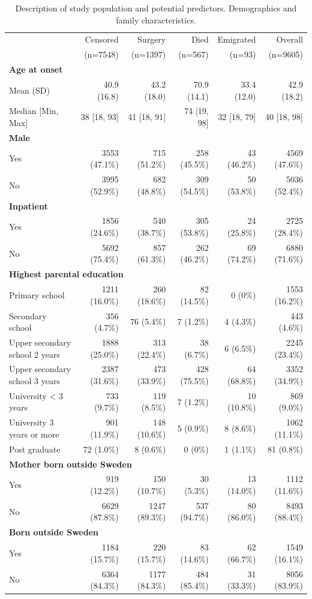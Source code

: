 \documentclass{statsoc}
\begin{document}
\begin{table}
\caption{\label{tab1} Description of study population and potential predictors. Demographics and family characteristics. } 
\centering
\begin{tabular}{p{3cm}rrrrr}
\hline
& Censored & Surgery & Died & Emigrated &  Overall \\
& (n=7548) & (n=1397) & (n=567) & (n=93) & (n=9605) \\
\hline
\textbf{Age at onset} & & & & & \\
Mean (SD) & 40.9 (16.8) & 43.2 (18.0) & 70.9 (14.1) & 33.4 (12.0) & 42.9
(18.2) \\
Median {[}Min, Max{]} & 38 {[}18, 93{]} & 41 {[}18, 91{]} &
74 {[}19, 98{]} & 32 {[}18, 79{]} & 40 {[}18, 98{]} \\
\textbf{Male} & & & & & \\
Yes & 3553 (47.1\%) & 715 (51.2\%) & 258 (45.5\%) & 43 (46.2\%) & 4569
(47.6\%) \\
No & 3995 (52.9\%) & 682 (48.8\%) & 309 (54.5\%) & 50 (53.8\%) & 5036
(52.4\%) \\
\textbf{Inpatient} & & & & & \\
Yes & 1856 (24.6\%) & 540 (38.7\%) & 305 (53.8\%) & 24 (25.8\%) & 2725
(28.4\%) \\
No & 5692 (75.4\%) & 857 (61.3\%) & 262 (46.2\%) & 69 (74.2\%) & 6880
(71.6\%) \\
\multicolumn{3}{l}{\textbf{Highest parental education}} & & & \\
Primary school & 1211 (16.0\%) & 260 (18.6\%) & 82 (14.5\%) & 0 (0\%) &
1553 (16.2\%) \\
Secondary school & 356 (4.7\%) & 76 (5.4\%) & 7 (1.2\%) & 4 (4.3\%) &
443 (4.6\%) \\
Upper secondary school 2 years & 1888 (25.0\%) & 313 (22.4\%) & 38
(6.7\%) & 6 (6.5\%) & 2245 (23.4\%) \\
Upper secondary school 3 years & 2387 (31.6\%) & 473 (33.9\%) & 428
(75.5\%) & 64 (68.8\%) & 3352 (34.9\%) \\
University \textless{} 3 years & 733 (9.7\%) & 119 (8.5\%) & 7 (1.2\%) &
10 (10.8\%) & 869 (9.0\%) \\
University 3 years or more & 901 (11.9\%) & 148 (10.6\%) & 5 (0.9\%) & 8
(8.6\%) & 1062 (11.1\%) \\
Post graduate & 72 (1.0\%) & 8 (0.6\%) & 0 (0\%) & 1 (1.1\%) & 81
(0.8\%) \\
\multicolumn{3}{l}{\textbf{Mother born outside Sweden}} & & & \\
Yes & 919 (12.2\%) & 150 (10.7\%) & 30 (5.3\%) & 13 (14.0\%) & 1112
(11.6\%) \\
No & 6629 (87.8\%) & 1247 (89.3\%) & 537 (94.7\%) & 80 (86.0\%) & 8493
(88.4\%) \\
\multicolumn{3}{l}{\textbf{Born outside Sweden}} & & & \\
Yes & 1184 (15.7\%) & 220 (15.7\%) & 83 (14.6\%) & 62 (66.7\%) & 1549
(16.1\%) \\
No & 6364 (84.3\%) & 1177 (84.3\%) & 484 (85.4\%) & 31 (33.3\%) & 8056
(83.9\%) \\
\hline
\end{tabular}
\end{table}
\end{document}

